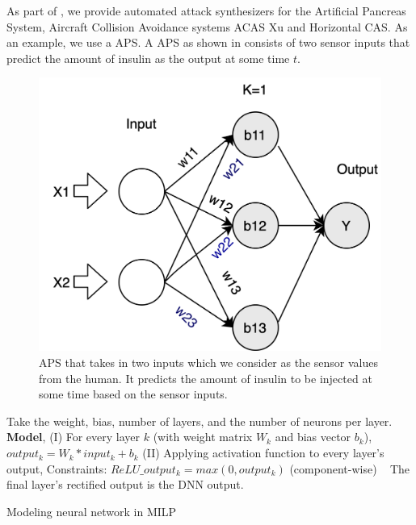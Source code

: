 As part of \tool, we provide automated attack synthesizers for the Artificial Pancreas System, Aircraft Collision Avoidance systems ACAS Xu and Horizontal CAS. 
As an example, we use a \ac{APS}.  
A \ac{APS} as shown in \label{fig:toyaps} consists of two sensor inputs that predict the amount of insulin as the output at some time $t$. 
\begin{figure}
	\centering
	\includegraphics[width=0.7\linewidth]{Images/ToyAPS}
	\caption[APS]{APS that takes in two inputs which we consider as the sensor values from the human. It predicts the amount of insulin to be injected at some time based on the sensor inputs.}
	\label{fig:toyaps}
\end{figure}


\begin{algorithm}
	Take the weight, bias, number of layers, and the number of neurons per layer. \\
	
	\textbf{Model}, \linebreak
	(I) For every layer $k$ (with weight matrix $W_k$ and bias vector $b_k$), $output_k = W_k * input_k + b_k$
	\linebreak
	(II) Applying activation function to every layer's output,
	\linebreak
	Constraints: $ReLU\_output_k = max(0, output_k)$ (component-wise) \
	\linebreak
	The final layer's rectified output is the DNN output.
	
	\caption{Modeling neural network in MILP}
	\label{algo:b}
\end{algorithm}




